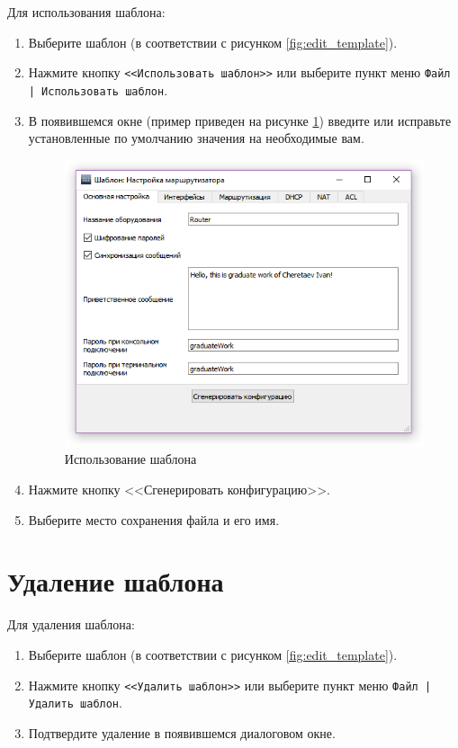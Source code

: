 Для использования шаблона:
\begin{enumerate}
	\item Выберите шаблон (в соответствии с рисунком \ref{fig:edit_template}).
	
	\item Нажмите кнопку \texttt{<<Использовать шаблон>>} или выберите пункт меню \texttt{Файл | Использовать шаблон}.
	
	\item В появившемся окне (пример приведен на рисунке \ref{fig:example}) введите или исправьте установленные по умолчанию значения на необходимые вам.
	
	
\begin{figure}[th!]
\centering
\includegraphics[width=1\linewidth]{pic/example}
\caption{Использование шаблона}
\label{fig:example}
\end{figure}
	
	\item Нажмите кнопку <<Сгенерировать конфигурацию>>.
	
	\item Выберите место сохранения файла и его имя.
\end{enumerate} 

\section{Удаление шаблона}

Для удаления шаблона:
\begin{enumerate}
	\item Выберите шаблон (в соответствии с рисунком \ref{fig:edit_template}).
	
	\item Нажмите кнопку \texttt{<<Удалить шаблон>>} или выберите пункт меню \texttt{Файл | Удалить шаблон}.
	
	\item Подтвердите удаление в появившемся диалоговом окне.
\end{enumerate} 

